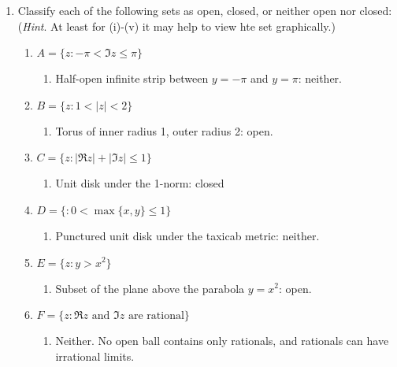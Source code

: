 \documentclass[11pt, a4paper, latinreim, shortsets]{notes}
\begin{document}
\begin{enumerate}[label={\bfseries II.5.\arabic*}]
\begin{enumerate}[label={\bfseries Theorem 1.\arabic*}]
\begin{proof}
				On the other hand, suppose we have a finite union of closed sets. By the same argument, the
				complement is a finite intersection of open sets. Since this is open, the complement is closed,
				and so closed subsets are closed under finite unions.
			\end{proof}
		\end{enumerate}

	\item Classify each of the following sets as open, closed, or neither open nor closed:
	(\textit{Hint}. At least for (i)-(v) it may help to view hte set graphically.)

	\begin{enumerate}[label=(\roman*)]
		\item $A = \{z : -\pi < \Im z \leq \pi \}$
			\begin{enumerate}
				\item[] Half-open infinite strip between $y=-\pi$ and $y=\pi$: neither.
			\end{enumerate}
		\item $B = \{ z : 1 < |z| < 2\}$
			\begin{enumerate}
				\item[] Torus of inner radius 1, outer radius 2: open.
			\end{enumerate}
		\item $C = \{ z : |\Re z| + |\Im z| \leq 1\}$
			\begin{enumerate}
				\item[] Unit disk under the 1-norm: closed
			\end{enumerate}
		\item $D = \{ : 0 < \max\{x,y\} \leq 1\}$
			\begin{enumerate}
				\item[] Punctured unit disk under the taxicab metric: neither.
			\end{enumerate}
		\item $E = \{z : y > x^2 \}$
			\begin{enumerate}
				\item[] Subset of the plane above the parabola $y=x^2$: open.
			\end{enumerate}
		\item $F = \{z : \Re z \text{ and } \Im z \text{ are rational}\}$
			\begin{enumerate}
				\item[] Neither. No open ball contains only rationals, and rationals can have
				irrational limits.
			\end{enumerate}
	\end{enumerate}


\end{enumerate}
\end{document}
